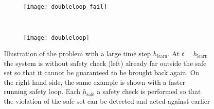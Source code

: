 \documentclass[../main.tex]{subfiles}
\begin{document}
\begin{figure}[t!]
    \centering
    \begin{subfigure}[t]{0.45\textwidth}
        \texttt{[image: doubleloop\_fail]}
    \end{subfigure}%
    ~ 
    \begin{subfigure}[t]{0.55\textwidth}
        \texttt{[image: doubleloop]}
        \end{subfigure}
        \caption{Illustration of the problem with a large time step $h_{\text{learn}}$. At $t= h_{\text{learn}}$ the system is without safety check (left) already far outside the safe set so that it cannot be guaranteed to be brought back again. On the right hand side, the same example is shown with a faster running safety loop. Each $h_{\text{safe}}$ a safety check is performed so that the violation of the safe set can be detected and acted against earlier}\label{fig:doubleloop}  
\end{figure}
\end{document}
